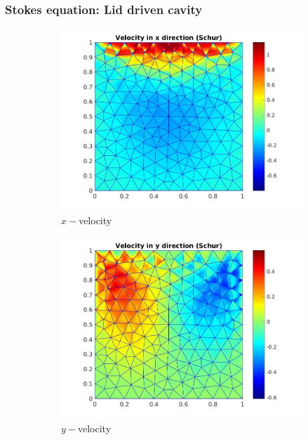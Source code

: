 \documentclass{beamer}
\begin{document}
\begin{frame}
\frametitle{Stokes equation: Lid driven cavity}
\begin{figure}
\begin{subfigure}{0.3\textwidth}	
  \includegraphics[width=\linewidth]{lid_schur_vx.jpg}
  \caption{$x-$velocity} 
  \label{x_vel_stoke_schur_lid}
\end{subfigure}
\begin{subfigure}{0.3\textwidth}	
  \includegraphics[width=\linewidth]{lid_schur_vy.jpg}
    \caption{$y-$velocity} 
    \label{y_vel_stoke_schur_lid}
\end{subfigure}
\begin{subfigure}{0.3\textwidth}	

\end{subfigure}
\end{figure}
\end{frame}
\end{document}
